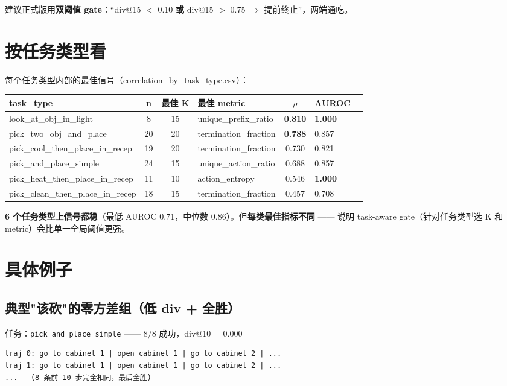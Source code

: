 \documentclass[11pt,a4paper]{article}
\begin{document}
建议正式版用\textbf{双阈值 gate}：``div@15 $<$ 0.10 \textbf{或} div@15 $>$ 0.75 $\Rightarrow$ 提前终止''，两端通吃。

\section{按任务类型看}

每个任务类型内部的最佳信号（correlation\_by\_task\_type.csv）：

\begin{longtable}{@{}lcclcll@{}}
\toprule
task\_type & n & 最佳 K & 最佳 metric & $\rho$ & AUROC \\
\midrule
look\_at\_obj\_in\_light         &  8 & 15 & unique\_prefix\_ratio    & \textbf{0.810} & \textbf{1.000} \\
pick\_two\_obj\_and\_place       & 20 & 20 & termination\_fraction    & \textbf{0.788} & 0.857 \\
pick\_cool\_then\_place\_in\_recep  & 19 & 20 & termination\_fraction    & 0.730 & 0.821 \\
pick\_and\_place\_simple         & 24 & 15 & unique\_action\_ratio    & 0.688 & 0.857 \\
pick\_heat\_then\_place\_in\_recep  & 11 & 10 & action\_entropy          & 0.546 & \textbf{1.000} \\
pick\_clean\_then\_place\_in\_recep & 18 & 15 & termination\_fraction    & 0.457 & 0.708 \\
\bottomrule
\end{longtable}

\textbf{6 个任务类型上信号都稳}（最低 AUROC 0.71，中位数 0.86）。但\textbf{每类最佳指标不同} —— 说明 task-aware gate（针对任务类型选 K 和 metric）会比单一全局阈值更强。

\section{具体例子}

\subsection*{典型"该砍"的零方差组（低 div + 全胜）}

任务：\texttt{pick\_and\_place\_simple} —— 8/8 成功，div@10 = 0.000

\begin{Verbatim}[fontsize=\small,frame=single]
traj 0: go to cabinet 1 | open cabinet 1 | go to cabinet 2 | ...
traj 1: go to cabinet 1 | open cabinet 1 | go to cabinet 2 | ...
...   (8 条前 10 步完全相同，最后全胜)
\end{Verbatim}
\end{document}
